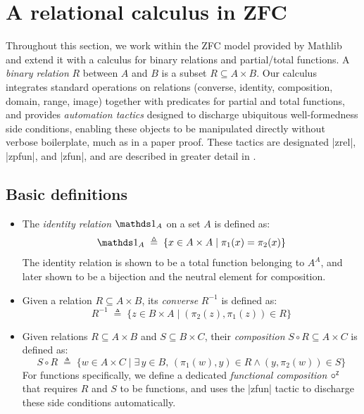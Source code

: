 \section{A relational calculus in ZFC}
\label{sec:zflean-rel}

Throughout this section, we work within the ZFC model provided by Mathlib and extend it with a calculus for binary relations and partial/total functions.
A \emph{binary relation} $R$ between $A$ and $B$ is a subset $R \subseteq A\times B$.
Our calculus integrates standard operations on relations (converse, identity, composition, domain, range, image) together with predicates for partial and total functions, and provides \emph{automation tactics} designed to discharge ubiquitous well-formedness side conditions, enabling these objects to be manipulated directly without verbose boilerplate, much as in a paper proof.
These tactics are designated \inlinelean|zrel|, \inlinelean|zpfun|, and \inlinelean|zfun|, and are described in greater detail in .

\subsection{Basic definitions}

\begin{definition}
  \label{def:rel-basic}
  \begin{itemize}
    \item The \emph{identity relation} $\Id{A}$ on a set $A$ is defined as:
          \begin{equation*}
            \Id{A} \;\triangleq\; \{ x \in A \times A \mid \pi_1(x) = \pi_2(x) \}
          \end{equation*}
          The identity relation is shown to be a total function belonging to $A^A$, and later shown to be a bijection and the neutral element for composition.
    \item Given a relation $R\subseteq A\times B$, its \emph{converse} $R^{-1}$ is defined as:
          \begin{equation*}
            R^{-1} \;\triangleq\; \{z \in B\times A \mid (\pi_2(z), \pi_1(z))\in R \}
          \end{equation*}
    \item Given relations $R\subseteq A\times B$ and $S\subseteq B\times C$, their \emph{composition} $S\circ R \subseteq A\times C$ is defined as:
          \begin{equation*}
            S \circ R \;\triangleq\; \{ w \in A\times C \mid \exists\, y \in B,\, (\pi_1(w), y)\in R \land (y, \pi_2(w))\in S \}
          \end{equation*}
          For functions specifically, we define a dedicated \emph{functional composition} $\mathbin{\circ^{\scriptscriptstyle{\mathsf{Z}}}}$ that requires $R$ and $S$ to be functions, and uses the \inlinelean|zfun| tactic to discharge these side conditions automatically.
  \end{itemize}
\end{definition}


